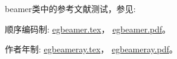 beamer类中的参考文献测试，参见:

顺序编码制:
\href{run:./example/egbeamer.tex}{egbeamer.tex}，
\href{run:./example/egbeamer.pdf}{egbeamer.pdf}。

作者年制:
\href{run:./example/egbeameray.tex}{egbeameray.tex}，
\href{run:./example/egbeameray.pdf}{egbeameray.pdf}。

%
%
%
%

